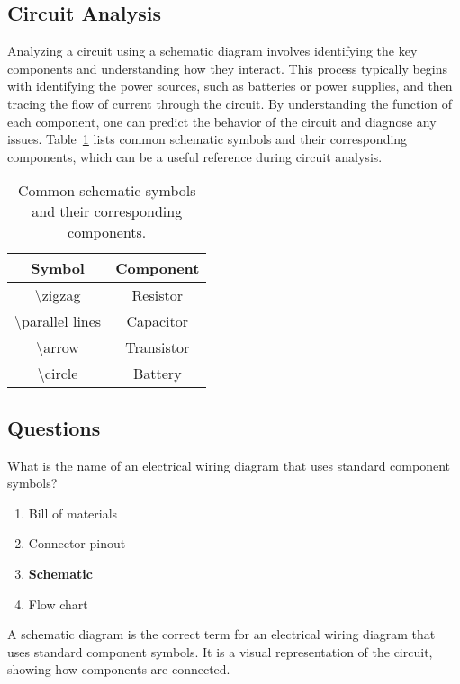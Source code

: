 \subsection*{Circuit Analysis}
Analyzing a circuit using a schematic diagram involves identifying the key components and understanding how they interact. This process typically begins with identifying the power sources, such as batteries or power supplies, and then tracing the flow of current through the circuit. By understanding the function of each component, one can predict the behavior of the circuit and diagnose any issues. Table~\ref{tab:schematic_symbols} lists common schematic symbols and their corresponding components, which can be a useful reference during circuit analysis.

\begin{table}[h!]
    \centering
    \begin{tabular}{|c|c|}
        \hline
        \textbf{Symbol} & \textbf{Component} \\
        \hline
        \textbackslash zigzag & Resistor \\
        \hline
        \textbackslash parallel lines & Capacitor \\
        \hline
        \textbackslash arrow & Transistor \\
        \hline
        \textbackslash circle & Battery \\
        \hline
    \end{tabular}
    \caption{Common schematic symbols and their corresponding components.}
    \label{tab:schematic_symbols}
\end{table}

\subsection*{Questions}
\begin{tcolorbox}[colback=gray!10!white,colframe=black!75!black,title={T6C01}]
    What is the name of an electrical wiring diagram that uses standard component symbols?
    \begin{enumerate}[label=\Alph*),noitemsep]
        \item Bill of materials
        \item Connector pinout
        \item \textbf{Schematic}
        \item Flow chart
    \end{enumerate}
\end{tcolorbox}
A schematic diagram is the correct term for an electrical wiring diagram that uses standard component symbols. It is a visual representation of the circuit, showing how components are connected.

